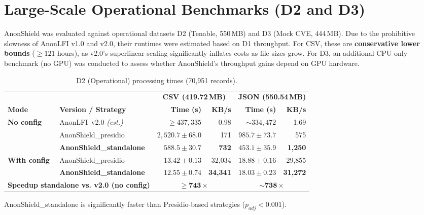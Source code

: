 \documentclass[12pt]{article}
\begin{document}
\section{Large-Scale Operational Benchmarks (D2 and D3)}
\label{sec:results_large_scale}

AnonShield was evaluated against operational datasets D2 (Tenable, 550\,MB) and D3 (Mock CVE, 444\,MB). Due to the prohibitive slowness of AnonLFI v1.0 and v2.0, their runtimes were estimated based on D1 throughput. For CSV, these are \textbf{conservative lower bounds} (${\geq}121$ hours), as v2.0’s superlinear scaling significantly inflates costs as file sizes grow. For D3, an additional CPU-only benchmark (no GPU) was conducted to assess whether AnonShield's throughput gains depend on GPU hardware.

\begin{table}[!htp]
\centering
\caption{D2 (Operational) processing times (70,951 records).}
\label{tab:large_scale_d2_merged}
\scriptsize
\begin{tabular}{llrrrr}
\toprule
 & & \multicolumn{2}{c}{\textbf{CSV (419.72\,MB)}} & \multicolumn{2}{c}{\textbf{JSON (550.54\,MB)}} \\
\cmidrule(lr){3-4}\cmidrule(lr){5-6}
\textbf{Mode} & \textbf{Version / Strategy} & \textbf{Time (s)} & \textbf{KB/s} & \textbf{Time (s)} & \textbf{KB/s} \\
\midrule
\multirow{3}{*}{\textbf{No config}}
 & AnonLFI~v2.0 \emph{(est.)} & ${\geq}437{,}335$ & 0.98 & ${\sim}334{,}472$ & 1.69 \\
 & AnonShield\_presidio & $2{,}520.7 \pm 68.0$ & 171 & $985.7 \pm 73.7$ & 575 \\
 & \textbf{AnonShield\_standalone} & $\mathbf{588.5 \pm 30.7}$ & \textbf{732} & $\mathbf{453.1 \pm 35.9}$ & \textbf{1{,}250} \\
\midrule
\multirow{2}{*}{\textbf{With config}}
 & AnonShield\_presidio & $13.42 \pm 0.13$ & 32{,}034 & $18.88 \pm 0.16$ & 29{,}855 \\
 & \textbf{AnonShield\_standalone} & $\mathbf{12.55 \pm 0.74}$ & \textbf{34{,}341} & $\mathbf{18.03 \pm 0.23}$ & \textbf{31{,}272} \\
\midrule
\multicolumn{2}{l}{\textbf{Speedup standalone vs. v2.0 (no config)}} & \multicolumn{2}{c}{$\mathbf{{\geq}743\times}$} & \multicolumn{2}{c}{$\mathbf{{\sim}738\times}$} \\
\bottomrule
\end{tabular}

\scriptsize AnonShield\_standalone is significantly faster than Presidio-based strategies ($p_{adj} < 0.001$).
\end{table}
\end{document}
